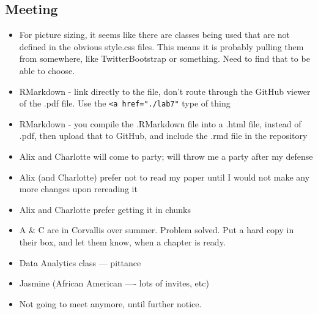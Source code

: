 \documentclass{article}
\begin{document}
\subsection*{Meeting}
\begin{itemize}
\item For picture sizing, it seems like there are classes being used that are not defined in the obvious style.css files. This means it is probably pulling them from somewhere, like TwitterBootstrap or something. Need to find that to be able to choose.
\item RMarkdown - link directly to the file, don't route through the GitHub viewer of the .pdf file. Use the \verb|<a href="./lab7"|
type of thing
\item RMarkdown - you compile the .RMarkdown file into a .html file, instead of .pdf, then upload that to GitHub, and include the .rmd file in the repository
\item Alix and Charlotte will come to party; will throw me a party after my defense
\item Alix (and Charlotte) prefer not to read my paper until I would not make any more changes upon rereading it
\item Alix and Charlotte prefer getting it in chunks
\item A \& C are in Corvallis over summer. Problem solved. Put a hard copy in their box, and let them know, when a chapter is ready.
\item Data Analytics class --- pittance
\item Jasmine (African American ---- lots of invites, etc)
\item Not going to meet anymore, until further notice.
\end{itemize}
\end{document}

